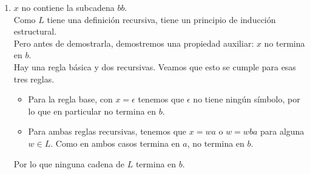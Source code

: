 \documentclass{article}
\begin{document}
\begin{enumerate}
{\begin{enumerate}
{\begin{itemize}
{\begin{itemize}
{                                    Caso 2, $w = xba$.\\
                                    Entonces, $n_a(xba) = n_a(x) + 1$ y
                                    $n_b(xba) = n_b(x) + 1$.\\ 
                                    Y por hipótesis, tenemos que 
                                    $n_a(x) \geq n_b(x)$, por lo que que 
                                    $n_a(xba) = n_a(x) + 1 \geq n_b(x) + 1 
                                    = n_b(xba)$.
                                }
                            \end{itemize}
                        }
                    \end{itemize}
                }
                \item {
                    $x$ no contiene la subcadena $bb$.\\
                    Como $L$ tiene una definición recursiva, tiene un principio 
                    de inducción estructural.\\
                    Pero antes de demostrarla, demostremos una propiedad auxiliar:
                    $x$ no termina en $b$.\\
                    Hay una regla básica y dos recursivas. Veamos que esto se 
                    cumple para esas tres reglas.

                    \begin{itemize}
                        \item {
                            Para la regla base, con $x = \epsilon$ tenemos que 
                            $\epsilon$ no tiene ningún símbolo, por lo que en 
                            particular no termina en $b$.
                        }
                        \item {
                            Para ambas reglas recursivas, tenemos que 
                            $x = wa$ o $w = wba$ para alguna $w \in L$. Como 
                            en ambos casos termina en $a$, no termina en $b$.
                        }
                    \end{itemize}
                    Por lo que ninguna cadena de $L$ termina en $b$. 

}
\end{enumerate}}
\end{enumerate}
\end{document}
